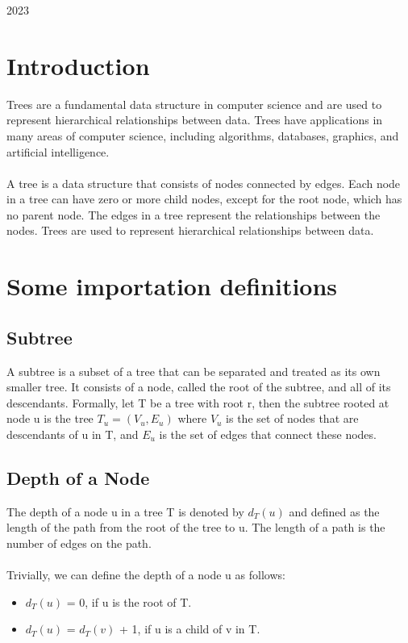 \documentclass[a4paper, 11pt, oneside]{book} %
\begin{document}
\begin{titlepage}
	\vspace{0.5\baselineskip} %
	
	\vfill %
	
	
	
	
	\vspace{0.3\baselineskip} %
	
	2023 %

\end{titlepage}

\section{Introduction}
Trees are a fundamental data structure in computer science and are used to represent hierarchical relationships between data. Trees have applications in many areas of computer science, including algorithms, databases, graphics, and artificial intelligence.
\\
\\
A tree is a data structure that consists of nodes connected by edges. Each node in a tree can have zero or more child nodes, except for the root node, which has no parent node. The edges in a tree represent the relationships between the nodes. Trees are used to represent hierarchical relationships between data.

\section{Some importation definitions}
\subsection{Subtree}
A subtree is a subset of a tree that can be separated and treated as its own smaller tree. It consists of a node, called the root of the subtree, and all of its descendants. Formally, let T be a tree with root r, then the subtree rooted at node u is the tree $T_u = (V_u, E_u)$ where $V_u$ is the set of nodes that are descendants of u in T, and $E_u$ is the set of edges that connect these nodes.

\subsection{Depth of a Node}
The depth of a node u in a tree T is denoted by $d_T(u)$ and defined as the length of the path from the root of the tree to u. The length of a path is the number of edges on the path.
\\
\\
Trivially, we can define the depth of a node u as follows:
\begin{itemize}
    \item $d_T(u)$ = 0, if u is the root of T.
    \item $d_T(u)$ = $d_T(v)$ + 1, if u is a child of v in T.
\end{itemize}
\end{document}
